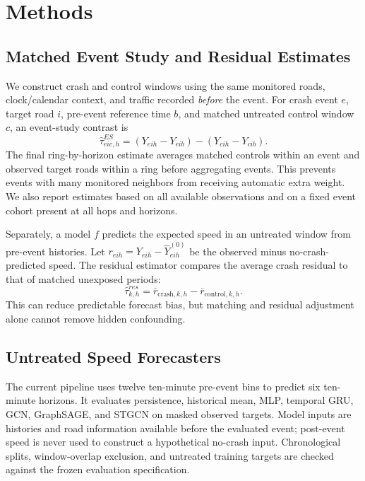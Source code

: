 \documentclass[sigconf,nonacm]{acmart}
\begin{document}
\section{Methods}
\subsection{Matched Event Study and Residual Estimates}
We construct crash and control windows using the same monitored roads,
clock/calendar context, and traffic recorded \emph{before} the event.
For crash event $e$, target road $i$, pre-event reference time $b$,
and matched untreated control window $c$, an event-study contrast is
\begin{equation}
 \widehat\tau^{ES}_{eic,h}
 =(Y_{eih}-Y_{eib})-(Y_{cih}-Y_{cib}).
 \label{eq:did}
\end{equation}
The final ring-by-horizon estimate averages matched controls within an
event and observed target roads within a ring before aggregating
events. This prevents events with many monitored neighbors from
receiving automatic extra weight. We also report estimates based on
all available observations and on a fixed event cohort present at
all hops and horizons.

Separately, a model $f$ predicts the expected speed in an untreated
window from pre-event histories. Let
$r_{eih}=Y_{eih}-\widehat Y^{(0)}_{eih}$ be the observed minus
no-crash-predicted speed. The residual estimator compares the average
crash residual to that of matched unexposed periods:
\begin{equation}
 \widehat\tau^{res}_{k,h}
 =\overline r_{\mathrm{crash},k,h}
  -\overline r_{\mathrm{control},k,h}.
 \label{eq:residual}
\end{equation}
This can reduce predictable forecast bias, but matching and residual
adjustment alone cannot remove hidden confounding.

\subsection{Untreated Speed Forecasters}
The current pipeline uses twelve ten-minute pre-event bins to predict
six ten-minute horizons. It evaluates persistence, historical mean,
MLP, temporal GRU, GCN, GraphSAGE, and STGCN on masked observed
targets. Model inputs are histories and road information available
before the evaluated event; post-event speed is never used to
construct a hypothetical no-crash input. Chronological splits,
window-overlap exclusion, and untreated training targets are checked
against the frozen evaluation specification.
\end{document}
